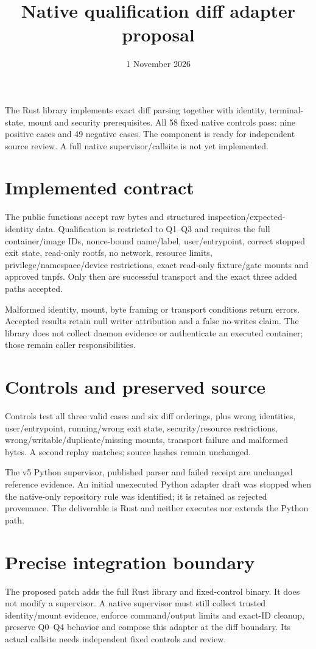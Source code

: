 \documentclass[10pt]{article}\usepackage[margin=0.8in]{geometry}\usepackage[T1]{fontenc}\usepackage{lmodern,hyperref}
\title{Native qualification diff adapter proposal}\date{1 November 2026}
\begin{document}
\maketitle
The Rust library implements exact diff parsing together with identity, terminal-state, mount and security prerequisites. All 58 fixed native controls pass: nine positive cases and 49 negative cases. The component is ready for independent source review. A full native supervisor/callsite is not yet implemented.
\section*{Implemented contract}
The public functions accept raw bytes and structured inspection/expected-identity data. Qualification is restricted to Q1--Q3 and requires the full container/image IDs, nonce-bound name/label, user/entrypoint, correct stopped exit state, read-only rootfs, no network, resource limits, privilege/namespace/device restrictions, exact read-only fixture/gate mounts and approved tmpfs. Only then are successful transport and the exact three added paths accepted.

Malformed identity, mount, byte framing or transport conditions return errors. Accepted results retain null writer attribution and a false no-writes claim. The library does not collect daemon evidence or authenticate an executed container; those remain caller responsibilities.
\section*{Controls and preserved source}
Controls test all three valid cases and six diff orderings, plus wrong identities, user/entrypoint, running/wrong exit state, security/resource restrictions, wrong/writable/duplicate/missing mounts, transport failure and malformed bytes. A second replay matches; source hashes remain unchanged.

The v5 Python supervisor, published parser and failed receipt are unchanged reference evidence. An initial unexecuted Python adapter draft was stopped when the native-only repository rule was identified; it is retained as rejected provenance. The deliverable is Rust and neither executes nor extends the Python path.
\section*{Precise integration boundary}
The proposed patch adds the full Rust library and fixed-control binary. It does not modify a supervisor. A native supervisor must still collect trusted identity/mount evidence, enforce command/output limits and exact-ID cleanup, preserve Q0--Q4 behavior and compose this adapter at the diff boundary. Its actual callsite needs independent fixed controls and review.
\end{document}
